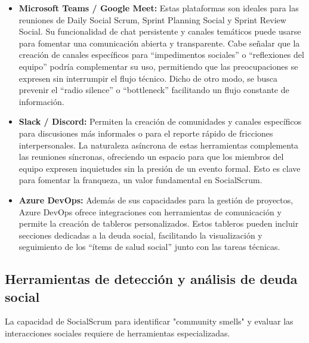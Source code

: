 \begin{itemize}
    \item \textbf{Microsoft Teams / Google Meet:} Estas plataformas son ideales para las reuniones de Daily Social Scrum, Sprint Planning Social y Sprint Review Social. Su funcionalidad de chat persistente y canales temáticos puede usarse para fomentar una comunicación abierta y transparente. Cabe señalar que la creación de canales específicos para ``impedimentos sociales'' o ``reflexiones del equipo'' podría complementar su uso, permitiendo que las preocupaciones se expresen sin interrumpir el flujo técnico. Dicho de otro modo, se busca prevenir el ``radio silence'' o ``bottleneck'' facilitando un flujo constante de información.
    \item \textbf{Slack / Discord:} Permiten la creación de comunidades y canales específicos para discusiones más informales o para el reporte rápido de fricciones interpersonales. La naturaleza asíncrona de estas herramientas complementa las reuniones síncronas, ofreciendo un espacio para que los miembros del equipo expresen inquietudes sin la presión de un evento formal. Esto es clave para fomentar la franqueza, un valor fundamental en SocialScrum.
    \item \textbf{Azure DevOps:} Además de sus capacidades para la gestión de proyectos, Azure DevOps ofrece integraciones con herramientas de comunicación y permite la creación de tableros personalizados. Estos tableros pueden incluir secciones dedicadas a la deuda social, facilitando la visualización y seguimiento de los ``ítems de salud social'' junto con las tareas técnicas.
\end{itemize}

\subsection{Herramientas de detección y análisis de deuda social}
La capacidad de SocialScrum para identificar "community smells" y evaluar las interacciones sociales requiere de herramientas especializadas.

